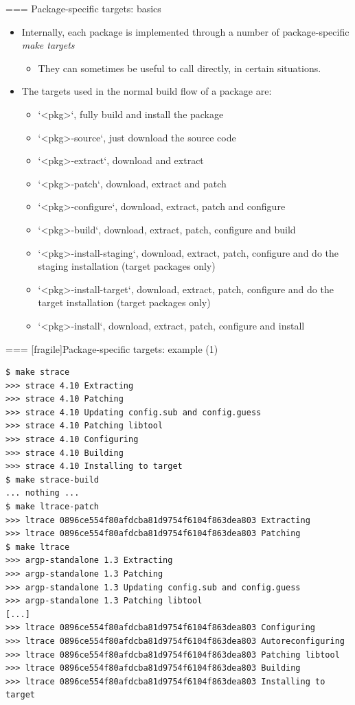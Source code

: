 === {Package-specific targets: basics}
  \begin{itemize}
  \item Internally, each package is implemented through a number of
    package-specific {\em make targets}
    \begin{itemize}
    \item They can sometimes be useful to call directly, in certain
      situations.
    \end{itemize}
  \item The targets used in the normal build flow of a package are:
    \begin{itemize}
    \item `<pkg>`, fully build and install the package
    \item `<pkg>-source`, just download the source code
    \item `<pkg>-extract`, download and extract
    \item `<pkg>-patch`, download, extract and patch
    \item `<pkg>-configure`, download, extract, patch and configure
    \item `<pkg>-build`, download, extract, patch, configure and build
    \item `<pkg>-install-staging`, download, extract, patch,
      configure and do the staging installation (target packages only)
    \item `<pkg>-install-target`, download, extract, patch,
      configure and do the target installation (target packages only)
    \item `<pkg>-install`, download, extract, patch,
      configure and install
    \end{itemize}
  \end{itemize}


=== [fragile]{Package-specific targets: example (1)}

\begin{block}{}
{\tiny
\begin{verbatim}
$ make strace
>>> strace 4.10 Extracting
>>> strace 4.10 Patching
>>> strace 4.10 Updating config.sub and config.guess
>>> strace 4.10 Patching libtool
>>> strace 4.10 Configuring
>>> strace 4.10 Building
>>> strace 4.10 Installing to target
$ make strace-build
... nothing ...
$ make ltrace-patch
>>> ltrace 0896ce554f80afdcba81d9754f6104f863dea803 Extracting
>>> ltrace 0896ce554f80afdcba81d9754f6104f863dea803 Patching
$ make ltrace
>>> argp-standalone 1.3 Extracting
>>> argp-standalone 1.3 Patching
>>> argp-standalone 1.3 Updating config.sub and config.guess
>>> argp-standalone 1.3 Patching libtool
[...]
>>> ltrace 0896ce554f80afdcba81d9754f6104f863dea803 Configuring
>>> ltrace 0896ce554f80afdcba81d9754f6104f863dea803 Autoreconfiguring
>>> ltrace 0896ce554f80afdcba81d9754f6104f863dea803 Patching libtool
>>> ltrace 0896ce554f80afdcba81d9754f6104f863dea803 Building
>>> ltrace 0896ce554f80afdcba81d9754f6104f863dea803 Installing to target
\end{verbatim}}
\end{block}



